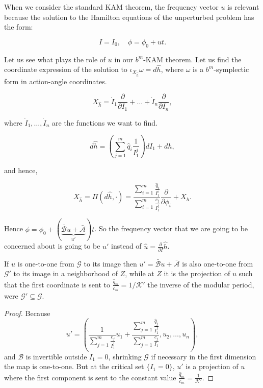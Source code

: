 \begin{remark}
When we consider the standard KAM theorem, the frequency vector $u$ is relevant because the solution to the Hamilton equations of the unperturbed problem has the form:

$$I = I_0, \quad \phi = \phi_0 + ut.$$

Let us see what plays the role of $u$ in our $b^m$-KAM theorem. Let us find the coordinate expression of the solution to $\iota_{X_{\hat{h}}} \omega=  d \hat{h}$, where $\omega$ is a $b^m$-symplectic form in action-angle coordinates.

$$X_{\hat{h}} = \dot{I}_1\frac{\partial}{\partial I_1} + \ldots + \dot{I}_n\frac{\partial}{\partial I_n},$$

where $\dot{I}_1,\ldots, \dot{I}_n$ are the functions we want to find.

$$d\hat{h} = \left(\sum_{j=1}^m \hat{q}_i \frac{1}{I_1^j}\right) dI_1 + dh,$$

and hence,

$$X_{\hat{h}} = \Pi(d \hat{h},\cdot ) = \frac{\sum_{i=1}^m \frac{\hat q_i}{I_1^i}}{\sum_{i=1}^m \frac{c_j}{I_1^j}}\frac{\partial}{\partial \phi_i} + X_h.$$

Hence $\phi = \phi_0 + (\underbrace{\bar{\mathcal{B}} u + \bar{\mathcal{A}}}_{u'})t$. So the frequency vector that we are going to be concerned about is going to be $u'$ instead of $\hat{u} = \frac{\partial}{\partial I} \hat{h}$.
\end{remark}
\begin{lemma}
If $u$ is one-to-one from $\mathcal{G}$ to its image then $u' = \bar{\mathcal{B}} u + \bar{\mathcal{A}}$ is also one-to-one from $\mathcal{G}'$ to its image in a neighborhood of $Z$, while at $Z$ it is the projection of $u$ such that the first coordinate is sent to $\frac{\hat q_m}{c_m} = 1/\mathcal{K}'$ the inverse of the modular period, were  $\mathcal{G}'\subseteq \mathcal{G}$.
\end{lemma}
\begin{proof}
Because $$u' = \left(\frac{1}{\sum_{j=1}^m \frac{c_j}{I_1^j}} u_1 + \frac{\sum_{j=1}^m \frac{\hat{q}_j}{I_1^j}}{\sum_{j=1}^m \frac{c_j}{I_1}},u_2,\ldots,u_n\right),$$
and  $\mathcal{B}$ is invertible outside $I_1 = 0$, shrinking $\mathcal{G}$ if necessary in the first dimension the map is one-to-one. But at the critical set $\{I_1 = 0\}$, $u'$ is a projection of $u$ where the first component is sent to the constant value $\frac{\hat q_m}{c_m} = \frac{1}{\mathcal{K}'}$.
\end{proof}
